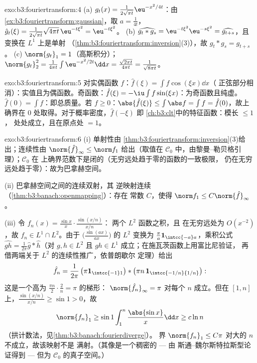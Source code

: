 \begin{solution}{exo:b3:fouriertransform:4}
(a) $g_t(x) = \frac1{2\sqrt{\pi t}}\eu^{-x^2/4t}$：由
\cref{ex:b3:fouriertransform:gaussian}，取 $a = \frac1{4t}$，
$\hat g_t(\xi) = \frac1{2\sqrt{\pi t}}\sqrt{4\pi
t}\,\eu^{-t\xi^2} = \eu^{-t\xi^2}$。
(b) $\widehat{g_t * g_s} = \eu^{-t\xi^2}\eu^{-s\xi^2} =
\widehat{g_{t+s}}$，且变换在 $L^1$ 上是单射
（\cref{thm:b3:fouriertransform:inversion}(3)），故 $g_t * g_s =
g_{t+s}$。
(c) $\norm{g_t}_1 = 1$（高斯积分）；
$\norm{g_t}_2^2 = \frac1{4\pi t}\int\eu^{-x^2/2t}\dd x =
\frac{\sqrt{2\pi t}}{4\pi t} = \frac1{\sqrt{8\pi t}}$。
\end{solution}

\begin{solution}{exo:b3:fouriertransform:5}
对实偶函数 $f$：$\hat f(\xi) = \int f\cos(\xi x)\dd x$（
正弦部分相消）：实值且为偶函数。奇函数：$\hat f(\xi) =
-\iu\int f\sin(\xi x)$：为奇函数且纯虚。$\hat f(0) =
\int f$：即总质量。若 $f \geq 0$：$\abs{\hat f(\xi)}
\leq \int\abs f = \int f = \hat f(0)$，故上确界在
$0$ 处取得。对于概率密度，$\hat f(-\xi)$ 即
\cref{ch:b3:clt}中的特征函数：模长 $\leq 1$，
处处成立，且在原点处 $= 1$。
\end{solution}

\begin{solution}{exo:b3:fouriertransform:6}
(i) 单射性由
\cref{thm:b3:fouriertransform:inversion}(3)给出；连续性由
$\norm{\hat f}_\infty \leq \norm f_1$ 给出（取值在
$\mathcal C_0$ 中，由黎曼–勒贝格引理）；$\mathcal C_0$ 在
上确界范数下是闭的（无穷远处趋于零的函数的一致极限，
仍在无穷远处趋于零）：故为巴拿赫空间。

(ii) 巴拿赫空间之间的连续双射，其
逆映射连续（\cref{thm:b3:banach:openmapping}）：存在
常数 $C$，使得 $\norm f_1 \leq C\norm{\hat f}_\infty$。

(iii) 令 $f_n(x) = \frac{\sin x}x\cdot\frac{\sin(x/n)}{x/n}$：
两个 $L^2$ 函数之积，且
在无穷远处为 $O(x^{-2})$，故 $f_n \in L^1\cap L^2$。由于
$\bigl(\frac{\sin(ax)}{ax}\bigr)$ 的 $L^2$ 变换为
$\frac\pi a\mathbf 1_{\intcc{-a}a}$，乘积公式
$\widehat{gh} = \frac1{2\pi}\hat g * \hat h$（对 $g, h
\in L^2$ 且 $gh \in L^1$ 成立；在施瓦茨函数上用富比尼验证，
再借两端关于 $L^2$ 的连续性推广，依普朗歇尔
定理）给出
\[
\hat f_n = \frac1{2\pi}\,\bigl(\pi\mathbf
1_{\intcc{-1}1}\bigr) * \bigl(\pi n\,\mathbf
1_{\intcc{-1/n}{1/n}}\bigr):
\]
这是一个高为 $\frac{\pi n}2\cdot\frac2n = \pi$ 的梯形：
$\norm{\hat f_n}_\infty = \pi$ 对每个 $n$ 成立。但在 $[1,
n]$ 上，$\frac{\sin(x/n)}{x/n} \geq \sin 1 > 0$，故
\[
\norm{f_n}_1 \geq \sin 1\int_1^n\frac{\abs{\sin x}}x\dd x
\geq c\ln n
\]
（拱计数法，见\cref{thm:b3:banach:fourierdiverge}）。
界 $\norm{f_n}_1 \leq C\pi$ 对大的 $n$ 不成立，故该映射不是
满射。（其像是一个稠密的 --- 由
斯通–魏尔斯特拉斯型论证得到 --- 但为
$\mathcal C_0$ 的真子空间。）
\end{solution}

